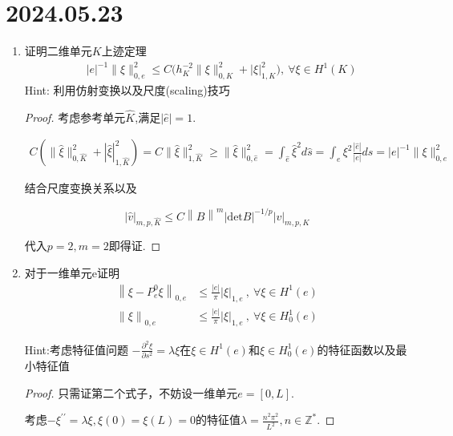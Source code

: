 \documentclass[12pt,a4paper]{article}
\begin{document}
	
	\noindent
	
	\section*{2024.05.23}	
	
	\begin{enumerate}
		\item 证明二维单元$K$上迹定理
		$$\begin{aligned}&|e|^{-1}\|\xi\|_{0,e}^{2}\leq C\Big(h_{K}^{-2}\|\xi\|_{0,K}^{2}+|\xi|_{1,K}^{2}\Big),\:\forall\xi\in H^{1}(K)\end{aligned}$$
		Hint: 利用仿射变换以及尺度(scaling)技巧
		
		\begin{proof}
			考虑参考单元$\hat{K}$,满足$|\hat{e}|=1$.
			
			\begin{equation*}
				\begin{aligned}
					C(\|\hat{\xi}\|_{0,\hat{K}}^{2}+|\hat{\xi}|_{1,\hat{K}}^{2}) = C\|\hat{\xi}\|_{1,\hat{K}}^2 \geq \|\hat{\xi}\|^2_{0,\hat{e}} = \int_{\hat{e}} \hat{\xi}^2 d\hat{s} = \int_{e}  \xi^2 \frac{|\hat{e}|}{|e|} ds = |e|^{-1}\|\xi\|_{0,e}^{2} 
				\end{aligned}
			\end{equation*}
			
			结合尺度变换关系以及
			
			$$
			|\hat{v}|_{m,p,\hat{K}}\leq C\left\|B\right\|^m|\mathrm{det}B|^{-1/p}|v|_{m,p,K}
			$$
			
			代入$p = 2, m= 2$即得证.
			
		\end{proof}
		
		\item 对于一维单元e证明
		$$\begin{aligned}\left\|\xi-P_{e}^{0}\xi\right\|_{0,e}&\leq\frac{|e|}\pi|\xi|_{1,e}\:,\:\forall\xi\in H^1(e)\\\left\|\xi\right\|_{0,e}&\leq\frac{|e|}\pi|\xi|_{1,e}\:,\:\forall\xi\in H_0^1(e)\end{aligned}$$
		
		Hint:考虑特征值问题 $-\frac{\partial^2 \xi}{\partial s^2} = \lambda \xi$在$\xi \in H^1(e)$和$\xi \in H_0^1(e)$的特征函数以及最小特征值
		
		\begin{proof}
		
			只需证第二个式子，不妨设一维单元$e = [0,L]$.
			
			考虑$-\xi ^{\prime\prime} = \lambda \xi, \xi(0) = \xi(L) = 0$的特征值$\lambda = \displaystyle \frac{n^2 \pi^2}{L^2} , n \in \mathbb{Z^*}$.
			

\end{proof}
\end{enumerate}
\end{document}
